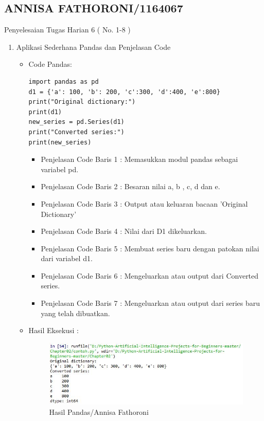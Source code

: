 \subsection{ANNISA FATHORONI/1164067}
Penyelesaian Tugas Harian 6 ( No. 1-8 )
\begin{enumerate}
\item Aplikasi Sederhana Pandas dan Penjelasan Code
\begin{itemize}
\item Code Pandas:

\begin{verbatim}
import pandas as pd
d1 = {'a': 100, 'b': 200, 'c':300, 'd':400, 'e':800}
print("Original dictionary:")
print(d1)
new_series = pd.Series(d1)
print("Converted series:")
print(new_series)
\end{verbatim}

\begin{itemize}
\item Penjelasan Code Baris 1 : Memasukkan modul pandas sebagai variabel pd.

\item Penjelasan Code Baris 2 : Besaran nilai a, b , c, d dan e.

\item Penjelasan Code Baris 3 : Output atau keluaran bacaan 'Original Dictionary'

\item Penjelasan Code Baris 4 : Nilai dari D1 dikeluarkan.

\item Penjelasan Code Baris 5 : Membuat series baru dengan patokan nilai dari variabel d1.

\item Penjelasan Code Baris 6 : Mengeluarkan atau output dari Converted series.

\item Penjelasan Code Baris 7 : Mengeluarkan atau output dari series baru yang telah dibuatkan.

\end{itemize}
\item Hasil Eksekusi :

\begin{figure}[ht]
\centering
\includegraphics[scale=0.6]{figures/Chapter3AnnisaFathoroniPandas2.jpg}
\caption{Hasil Pandas/Annisa Fathoroni}
\label{contoh}
\end{figure}


\end{itemize}
\end{enumerate}
